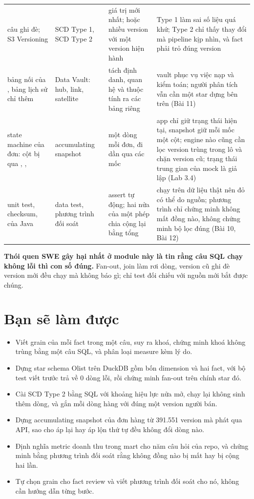 \begin{xltabular}{\textwidth}{@{}P{3.2cm} P{2.8cm} L L@{}}
câu  ghi đè; S3 Versioning & SCD Type 1, SCD Type 2 & giá trị mới nhất; hoặc nhiều version với một version hiện hành & Type 1 làm sai số liệu quá khứ; Type 2 chỉ thấy thay đổi mà pipeline kịp nhìn, và fact phải trỏ đúng version \\
bảng nối của , bảng lịch sử chỉ thêm & Data Vault: hub, link, satellite & tách định danh, quan hệ và thuộc tính ra các bảng riêng & vault phục vụ việc nạp và kiểm toán; người phân tích vẫn cần một star dựng bên trên (Bài 11) \\
state machine của đơn: cột  bị  qua , ,  & accumulating snapshot & một dòng mỗi đơn, đi dần qua các mốc & app chỉ giữ trạng thái hiện tại, snapshot giữ mỗi mốc một cột; engine nào cũng cần lọc version trùng trong lô và chặn version cũ; trạng thái trung gian của mock là giả lập (Lab 3.4) \\
unit test, checksum,  của Java & data test, phương trình đối soát & assert tự động; hai nửa của một phép chia cộng lại bằng tổng & chạy trên dữ liệu thật nên đỏ có thể do nguồn; phương trình chỉ chứng minh không mất đồng nào, không chứng minh bộ lọc đúng (Bài 10, Bài 12) \\
\end{xltabular}

\textbf{Thói quen SWE gây hại nhất ở module này là tin rằng câu SQL chạy không lỗi thì con số đúng.} Fan-out, join làm rơi dòng, version cũ ghi đè version mới đều chạy mà không báo gì; chỉ test đối chiếu với nguồn mới bắt được chúng.

\section{Bạn sẽ làm được}

\begin{itemize}
  \item Viết grain của mỗi fact trong một câu, suy ra khoá, chứng minh khoá không trùng bằng một câu SQL, và phân loại measure kèm lý do.
  \item Dựng star schema Olist trên DuckDB gồm bốn dimension và hai fact, với bộ test viết trước trả về 0 dòng lỗi, rồi chứng minh fan-out trên chính star đó.
  \item Cài SCD Type 2 bằng SQL với khoảng hiệu lực nửa mở, chạy lại không sinh thêm dòng, và gắn mỗi dòng hàng với đúng một version người bán.
  \item Dựng accumulating snapshot của đơn hàng từ 391.551 version mà  phát qua API, sao cho áp lại hay áp lộn thứ tự đều không đổi dòng nào.
  \item Định nghĩa metric doanh thu trong mart cho năm câu hỏi của repo, và chứng minh bằng phương trình đối soát rằng không đồng nào bị mất hay bị cộng hai lần.
  \item Tự chọn grain cho fact review và viết phương trình đối soát cho nó, không cần hướng dẫn từng bước.
\end{itemize}


